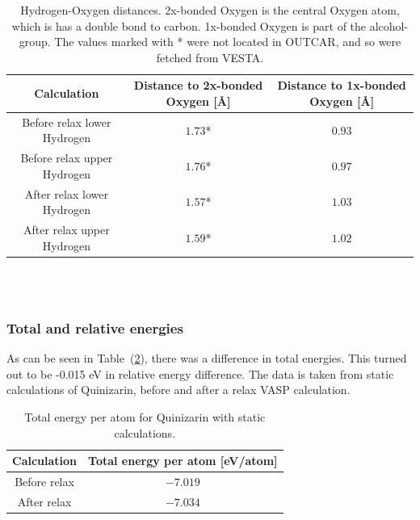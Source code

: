 \documentclass{article}
\begin{document}
      \begin{table}[H]
        \centering
        \caption{Hydrogen-Oxygen distances. 2x-bonded Oxygen is the central Oxygen atom, which is has a double bond to carbon. 1x-bonded Oxygen is part of the alcohol-group. The values marked with * were not located in OUTCAR, and so were fetched from VESTA. }
        \label{tab:neighborquinizarin}
        \begin{tabular}{|c|c|c|}
            \hline
            Calculation & Distance to 2x-bonded Oxygen [Å] & Distance to 1x-bonded Oxygen [Å] \\
            \hline \hline
            Before relax lower Hydrogen & $1.73$* & $0.93$ \\
            Before relax upper Hydrogen & $1.76$* & $0.97$ \\
            After relax lower Hydrogen & $1.57$* & $1.03$ \\
            After relax upper Hydrogen & $1.59$* & $1.02$ \\
            \hline
        \end{tabular} \\
        \hspace{0pt}\\
      \end{table}

      \vspace{1cm}

    \subsubsection{Total and relative energies}

      As can be seen in Table~(\ref{tab:TOTENquinizarin}), there was a difference in total energies. This turned out to be -0.015 eV in relative energy difference. The data is taken from static calculations of Quinizarin, before and after a relax VASP calculation. \\

      \begin{table}[H]
        \centering
        \caption{Total energy per atom for Quinizarin with static calculations. }
        \label{tab:TOTENquinizarin}
        \begin{tabular}{|c|c|}
            \hline
            Calculation & Total energy per atom [eV/atom]  \\
            \hline \hline
            Before relax & $-7.019$ \\
            After relax & $-7.034$ \\
            \hline
        \end{tabular} \\
        \hspace{0pt}\\
    \end{table}
\end{document}

